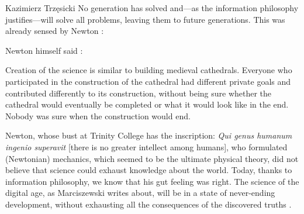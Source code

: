 \begin{artengenv}{Kazimierz Trzęsicki}
No generation has solved and---as the information philosophy justifies---will solve all problems, leaving them to future generations. This was already sensed by Newton \parencite[p.643] {Westfall1983}: 


Newton himself said \parencite[p.407]{Brewster1855}: 

Creation of the science is similar to building medieval cathedrals. Everyone who participated in the construction of the cathedral had different private goals and contributed differently to its construction, without being sure whether the cathedral would eventually be completed or what it would look like in the end. Nobody was sure when the construction would end.

Newton, whose bust at Trinity College has the inscription: \emph{Qui genus humanum ingenio superavit} [there is no greater intellect among humans], who formulated (Newtonian) mechanics, which seemed to be the ultimate physical theory, did not believe that science could exhaust knowledge about the world. Today, thanks to information philosophy, we know that his gut feeling was right. The science of the digital age, as Marciszewski  writes about, will be in a state of never-ending development, without exhausting all the consequences of the discovered truths \parencite{MarciszewskiStacewicz2011}.


\end{artengenv}
